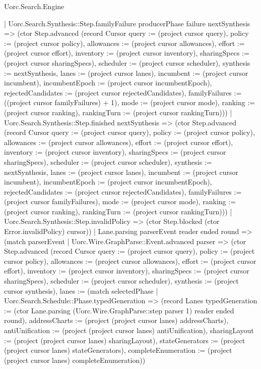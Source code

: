 \begin{lexlean}{Uorc.Search.Engine}
\begin{semanticmodule}
{      | Uorc.Search.Synthesis::Step.familyFailure producerPhase failure nextSynthesis => (ctor Step.advanced (record Cursor {query := (project cursor query), policy := (project cursor policy), allowances := (project cursor allowances), effort := (project cursor effort), inventory := (project cursor inventory), sharingSpecs := (project cursor sharingSpecs), scheduler := (project cursor scheduler), synthesis := nextSynthesis, lanes := (project cursor lanes), incumbent := (project cursor incumbent), incumbentEpoch := (project cursor incumbentEpoch), rejectedCandidates := (project cursor rejectedCandidates), familyFailures := ((project cursor familyFailures) + 1), mode := (project cursor mode), ranking := (project cursor ranking), rankingTurn := (project cursor rankingTurn)}))
      | Uorc.Search.Synthesis::Step.finished nextSynthesis => (ctor Step.advanced (record Cursor {query := (project cursor query), policy := (project cursor policy), allowances := (project cursor allowances), effort := (project cursor effort), inventory := (project cursor inventory), sharingSpecs := (project cursor sharingSpecs), scheduler := (project cursor scheduler), synthesis := nextSynthesis, lanes := (project cursor lanes), incumbent := (project cursor incumbent), incumbentEpoch := (project cursor incumbentEpoch), rejectedCandidates := (project cursor rejectedCandidates), familyFailures := (project cursor familyFailures), mode := (project cursor mode), ranking := (project cursor ranking), rankingTurn := (project cursor rankingTurn)}))
      | Uorc.Search.Synthesis::Step.invalidPolicy => (ctor Step.blocked (ctor Error.invalidPolicy) cursor))
    | Lane.parsing parserEvent reader ended round => (match parserEvent
      | Uorc.Wire.GraphParse::Event.advanced parser => (ctor Step.advanced (record Cursor {query := (project cursor query), policy := (project cursor policy), allowances := (project cursor allowances), effort := (project cursor effort), inventory := (project cursor inventory), sharingSpecs := (project cursor sharingSpecs), scheduler := (project cursor scheduler), synthesis := (project cursor synthesis), lanes := (match selectedPhase
        | Uorc.Search.Schedule::Phase.typedGeneration => (record Lanes {typedGeneration := (ctor Lane.parsing (Uorc.Wire.GraphParse::step parser 1) reader ended round), addressCharts := (project (project cursor lanes) addressCharts), antiUnification := (project (project cursor lanes) antiUnification), sharingLayout := (project (project cursor lanes) sharingLayout), stateGenerators := (project (project cursor lanes) stateGenerators), completeEnumeration := (project (project cursor lanes) completeEnumeration)})
}}
\end{semanticmodule}
\end{lexlean}
